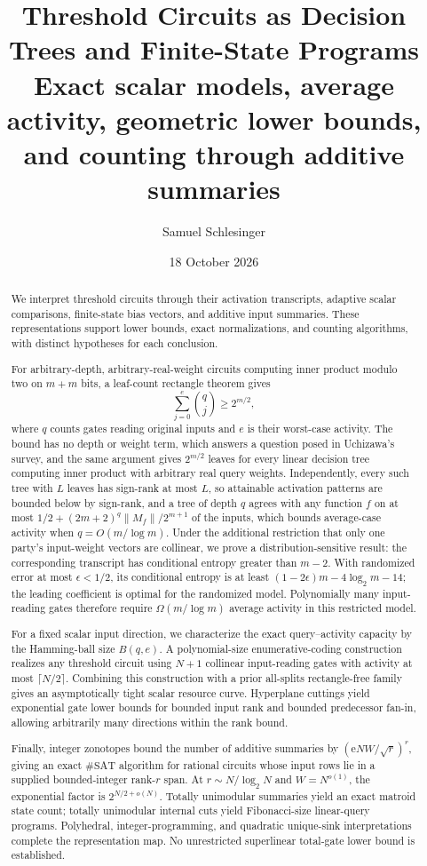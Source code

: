 \documentclass[11pt]{article}
\title{\bfseries Threshold Circuits as Decision Trees and Finite-State Programs\\[5pt]
\large Exact scalar models, average activity, geometric lower bounds,\\
and counting through additive summaries}
\author{Samuel Schlesinger}
\date{18 October 2026}
\theoremstyle{definition}
\newcommand{\Eul}{\mathrm e}
\begin{document}
\maketitle
\begin{abstract}
We interpret threshold circuits through their activation transcripts, adaptive scalar comparisons, finite-state bias vectors, and additive input summaries. These representations support lower bounds, exact normalizations, and counting algorithms, with distinct hypotheses for each conclusion.

For arbitrary-depth, arbitrary-real-weight circuits computing inner product modulo two on \(m+m\) bits, a leaf-count rectangle theorem gives
\[
 \sum_{j=0}^{e}\binom qj\ge2^{m/2},
\]
where \(q\) counts gates reading original inputs and \(e\) is their worst-case activity. The bound has no depth or weight term, which answers a question posed in Uchizawa's survey, and the same argument gives \(2^{m/2}\) leaves for every linear decision tree computing inner product with arbitrary real query weights. Independently, every such tree with \(L\) leaves has sign-rank at most \(L\), so attainable activation patterns are bounded below by sign-rank, and a tree of depth \(q\) agrees with any function \(f\) on at most \(1/2+(2m+2)^q\|M_f\|/2^{m+1}\) of the inputs, which bounds average-case activity when \(q=O(m/\log m)\). Under the additional restriction that only one party's input-weight vectors are collinear, we prove a distribution-sensitive result: the corresponding transcript has conditional entropy greater than \(m-2\). With randomized error at most \(\epsilon<1/2\), its conditional entropy is at least \((1-2\epsilon)m-4\log_2m-14\); the leading coefficient is optimal for the randomized model. Polynomially many input-reading gates therefore require \(\Omega(m/\log m)\) average activity in this restricted model.

For a fixed scalar input direction, we characterize the exact query--activity capacity by the Hamming-ball size \(B(q,e)\). A polynomial-size enumerative-coding construction realizes any threshold circuit using \(N+1\) collinear input-reading gates with activity at most \(\lceil N/2\rceil\). Combining this construction with a prior all-splits rectangle-free family gives an asymptotically tight scalar resource curve. Hyperplane cuttings yield exponential gate lower bounds for bounded input rank and bounded predecessor fan-in, allowing arbitrarily many directions within the rank bound.

Finally, integer zonotopes bound the number of additive summaries by \((\Eul NW/\sqrt r)^r\), giving an exact \(\#\mathrm{SAT}\) algorithm for rational circuits whose input rows lie in a supplied bounded-integer rank-\(r\) span. At \(r\sim N/\log_2N\) and \(W=N^{o(1)}\), the exponential factor is \(2^{N/2+o(N)}\). Totally unimodular summaries yield an exact matroid state count; totally unimodular internal cuts yield Fibonacci-size linear-query programs. Polyhedral, integer-programming, and quadratic unique-sink interpretations complete the representation map. No unrestricted superlinear total-gate lower bound is established.
\end{abstract}
\end{document}
